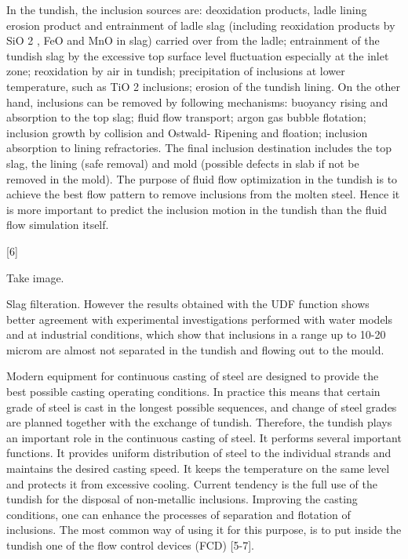 In the tundish, the
inclusion sources are: deoxidation products, ladle lining
erosion product and entrainment of ladle slag (including reoxidation products by SiO 2 , FeO and MnO in slag)
carried over from the ladle; entrainment of the tundish slag
by the excessive top surface level fluctuation especially at
the inlet zone; reoxidation by air in tundish; precipitation
of inclusions at lower temperature, such as TiO 2
inclusions; erosion of the tundish lining. On the other hand, inclusions can be removed by
following mechanisms: buoyancy rising and absorption to
the top slag; fluid flow transport; argon gas bubble
flotation; inclusion growth by collision and Ostwald-
Ripening and floation; inclusion absorption to lining
refractories.
The final inclusion destination includes the top slag, the
lining (safe removal) and mold (possible defects in slab if
not be removed in the mold).
The purpose of fluid flow optimization in the tundish is to
achieve the best flow pattern to remove inclusions from
the molten steel. Hence it is more important to predict the
inclusion motion in the tundish than the fluid flow
simulation itself.

[6]

Take image. 

Slag filteration. However the results obtained with the UDF function
shows better agreement with experimental investigations performed
with water models and at industrial conditions, which show that
inclusions in a range up to 10-20 microm are almost not separated in
the tundish and flowing out to the mould.

Modern equipment for continuous casting of steel are
designed to provide the best possible casting operating conditions.
In practice this means that certain grade of steel is cast in the
longest possible sequences, and change of steel grades are
planned together with the exchange of tundish. Therefore, the
tundish plays an important role in the continuous casting of steel.
It performs several important functions. It provides uniform
distribution of steel to the individual strands and maintains the
desired casting speed. It keeps the temperature on the same level
and protects it from excessive cooling. Current tendency is the
full use of the tundish for the disposal of non-metallic inclusions.
Improving the casting conditions, one can enhance the processes
of separation and flotation of inclusions. The most common way
of using it for this purpose, is to put inside the tundish one of the
flow control devices (FCD) [5-7]. 

